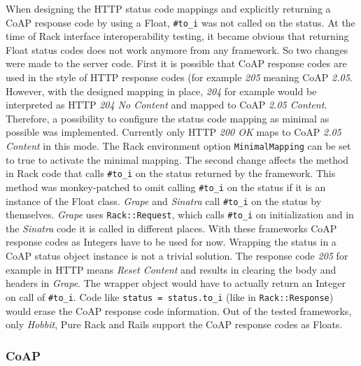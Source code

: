 			When designing the \ac{HTTP} status code mappings and explicitly
			returning a \ac{CoAP} response code by using a Float,
			\texttt{\#to\_i} was not called on the status. At the time of
			Rack interface interoperability testing, it became obvious
			that returning Float status codes does not work anymore from any
			framework. So two changes were made to the server code. First it is
			possible that \ac{CoAP} response codes are used in the style of
			\ac{HTTP} response codes (for example \emph{205} meaning
			\ac{CoAP} \emph{2.05}. However, with the designed mapping in place,
			\emph{204} for example would be interpreted as \ac{HTTP} \emph{204
			No Content} and mapped to \ac{CoAP} \emph{2.05 Content}. Therefore,
			a possibility to configure the status code mapping as minimal as
			possible was implemented. Currently only \ac{HTTP} \emph{200 OK}
			maps to \ac{CoAP} \emph{2.05 Content} in this mode. The Rack
			environment option \texttt{MinimalMapping} can be set to true to
			activate the minimal mapping. The second change affects the method
			in Rack code that calls \texttt{\#to\_i} on the status returned by
			the framework. This method was monkey-patched to omit calling
			\texttt{\#to\_i} on the status if it is an instance of the Float
			class. \emph{Grape} and \emph{Sinatra} call \texttt{\#to\_i} on the
			status by themselves. \emph{Grape} uses \texttt{Rack::Request},
			which calls \texttt{\#to\_i} on initialization and in the
			\emph{Sinatra} code it is called in different places. With these
			frameworks \ac{CoAP} response codes as Integers have to be used for
			now. Wrapping the status in a \ac{CoAP} status object instance is
			not a trivial solution. The response code \emph{205} for example in
			\ac{HTTP} means \emph{Reset Content} and results in clearing the
			body and headers in \emph{Grape}. The wrapper object would have to
			actually return an Integer on call of \texttt{\#to\_i}. Code like
			\texttt{status = status.to\_i} (like in \texttt{Rack::Response})
			would erase the \ac{CoAP} response code information. Out of the
			tested frameworks, only \emph{Hobbit}, Pure Rack and Rails support
			the \ac{CoAP} response codes as Floats.

		\subsubsection{\ac{CoAP}}

